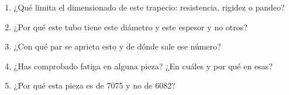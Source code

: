 \begin{juez}
\begin{enumerate}
  \item ¿Qué limita el dimensionado de este trapecio: resistencia, rigidez o pandeo?
  \item ¿Por qué este tubo tiene este diámetro y este espesor y no otros?
  \item ¿Con qué par se aprieta esto y de dónde sale ese número?
  \item ¿Has comprobado fatiga en alguna pieza? ¿En cuáles y por qué en esas?
  \item ¿Por qué esta pieza es de 7075 y no de 6082?
\end{enumerate}
\end{juez}
